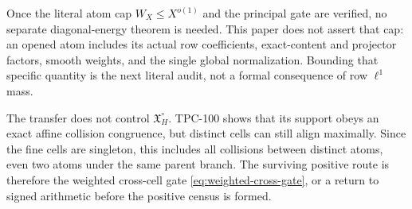 \begin{remark}
Once the literal atom cap \(W_X\le X^{o(1)}\) and the principal gate
are verified, no separate diagonal-energy theorem is needed.  This
paper does not assert that cap: an opened atom includes its actual
row coefficients, exact-content and projector factors, smooth
weights, and the single global normalization.  Bounding that
specific quantity is the next literal audit, not a formal
consequence of row \(\ell^1\) mass.
\end{remark}

\begin{remark}
The transfer does not control
\(\mathfrak X_H^\circ\).  TPC-100 shows that its support obeys an
exact affine collision congruence, but distinct cells can still
align maximally.  Since the fine cells are singleton, this includes
all collisions between distinct atoms, even two atoms under the
same parent branch.  The surviving positive route is therefore the
weighted cross-cell gate \eqref{eq:weighted-cross-gate}, or a return
to signed arithmetic before the positive census is formed.
\end{remark}
